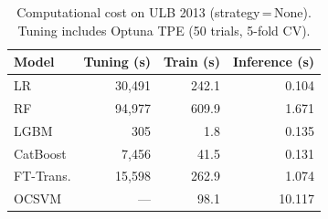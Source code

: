 \begin{table}[ht!]
\centering
\caption{Computational cost on ULB 2013 (strategy\,=\,None). Tuning includes Optuna TPE (50 trials, 5-fold CV).}
\label{tab:cost_ulb}
\begin{tabular}{l r r r}
\toprule
Model & Tuning (s) & Train (s) & Inference (s) \\
\midrule
LR         & 30,491 & 242.1 & 0.104 \\
RF         & 94,977 & 609.9 & 1.671 \\
LGBM       & 305 & 1.8 & 0.135 \\
CatBoost   & 7,456 & 41.5 & 0.131 \\
FT-Trans.  & 15,598 & 262.9 & 1.074 \\
OCSVM      & --- & 98.1 & 10.117 \\
\bottomrule
\end{tabular}
\end{table}